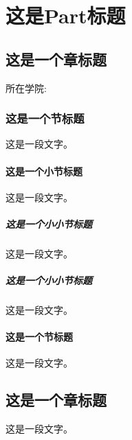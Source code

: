 \documentclass[UTF8,fontset = windows,zihao=-4,scheme=chinese,space=auto,linespread=1.25,oneside]{ctexbook}
\begin{document}
	\part{这是Part标题}	%
	\chapter{这是一个章标题}
	\noindent 所在学院:
	
	
	
	\section{这是一个节标题}
	这是一段文字。
	\subsection{这是一个小节标题}
	这是一段文字。
	\subsubsection{这是一个小小节标题}
	这是一段文字。
	\subsubsection{这是一个小小节标题}
	这是一段文字。
	\subsection{这是一个节标题}
	这是一段文字。
	
	\chapter{这是一个章标题}%
	这是一段文字。
\end{document}
